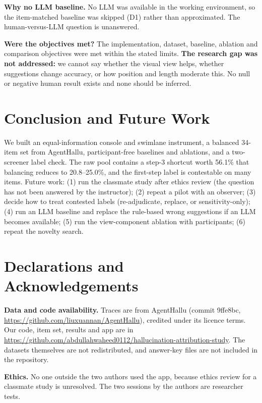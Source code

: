 \documentclass[conference]{IEEEtran}
\begin{document}
\textbf{Why no LLM baseline.} No LLM was available in the working environment, so the item-matched baseline was skipped (D1) rather than approximated. The human-versus-LLM question is unanswered.

\textbf{Were the objectives met?} The implementation, dataset, baseline, ablation and comparison objectives were met within the stated limits. \textbf{The research gap was not addressed:} we cannot say whether the visual view helps, whether suggestions change accuracy, or how position and length moderate this. No null or negative human result exists and none should be inferred.

\section{Conclusion and Future Work}
We built an equal-information console and swimlane instrument, a balanced 34-item set from AgentHallu, participant-free baselines and ablations, and a two-screener label check. The raw pool contains a step-3 shortcut worth 56.1\% that balancing reduces to 20.8--25.0\%, and the first-step label is contestable on many items. Future work: (1) run the classmate study after ethics review (the question has not been answered by the instructor); (2) repeat a pilot with an observer; (3) decide how to treat contested labels (re-adjudicate, replace, or sensitivity-only); (4) run an LLM baseline and replace the rule-based wrong suggestions if an LLM becomes available; (5) run the view-component ablation with participants; (6) repeat the novelty search.

\section*{Declarations and Acknowledgements}
\textbf{Data and code availability.} Traces are from AgentHallu (commit 9ffe8bc, \url{https://github.com/liuxuannan/AgentHallu}), credited under its licence terms. Our code, item set, results and app are in \url{https://github.com/abdullahwaheed0112/hallucination-attribution-study}. The datasets themselves are not redistributed, and answer-key files are not included in the repository.

\textbf{Ethics.} No one outside the two authors used the app, because ethics review for a classmate study is unresolved. The two sessions by the authors are researcher tests.
\end{document}
